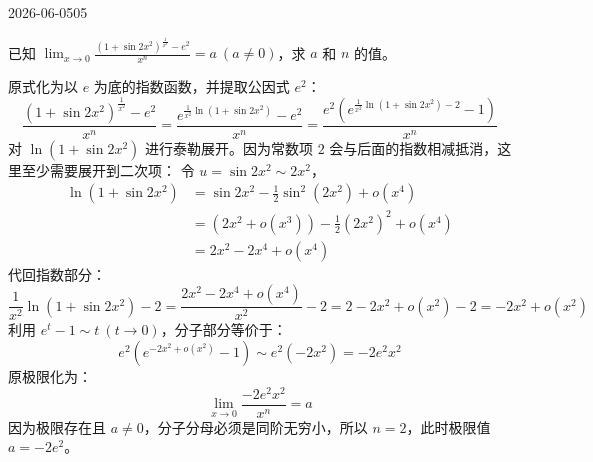 \begin{mistake}{2026-06-05}{05}

\begin{problemcontent}
已知 \(\lim_{x \to 0} \frac{(1+\sin 2x^2)^{\frac{1}{x^2}} - e^2}{x^n} = a \ (a \neq 0)\)，求 \(a\) 和 \(n\) 的值。
\end{problemcontent}

\begin{solutioncontent}
原式化为以 \(e\) 为底的指数函数，并提取公因式 \(e^2\)：
\[
\frac{(1+\sin 2x^2)^{\frac{1}{x^2}} - e^2}{x^n} = \frac{e^{\frac{1}{x^2}\ln(1+\sin 2x^2)} - e^2}{x^n} = \frac{e^2(e^{\frac{1}{x^2}\ln(1+\sin 2x^2) - 2} - 1)}{x^n}
\]
对 \(\ln(1+\sin 2x^2)\) 进行泰勒展开。因为常数项 \(2\) 会与后面的指数相减抵消，这里至少需要展开到二次项：
令 \(u = \sin 2x^2 \sim 2x^2\)，
\[
\begin{aligned}
\ln(1+\sin 2x^2) &= \sin 2x^2 - \frac{1}{2}\sin^2(2x^2) + o(x^4) \\
&= (2x^2 + o(x^3)) - \frac{1}{2}(2x^2)^2 + o(x^4) \\
&= 2x^2 - 2x^4 + o(x^4)
\end{aligned}
\]
代回指数部分：
\[
\frac{1}{x^2}\ln(1+\sin 2x^2) - 2 = \frac{2x^2 - 2x^4 + o(x^4)}{x^2} - 2 = 2 - 2x^2 + o(x^2) - 2 = -2x^2 + o(x^2)
\]
利用 \(e^t - 1 \sim t\ (t \to 0)\)，分子部分等价于：
\[
e^2 (e^{-2x^2 + o(x^2)} - 1) \sim e^2 (-2x^2) = -2e^2 x^2
\]
原极限化为：
\[
\lim_{x \to 0} \frac{-2e^2 x^2}{x^n} = a
\]
因为极限存在且 \(a \neq 0\)，分子分母必须是同阶无穷小，所以 \(n = 2\)，此时极限值 \(a = -2e^2\)。
\end{solutioncontent}


\end{mistake}
